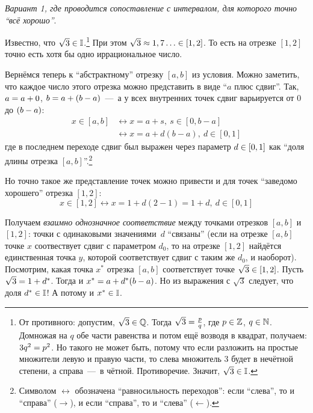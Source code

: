 \documentclass[a4paper,12pt]{article}
\begin{document}
  \begin{solution}
  
    \mbox{}\par
    \emph{Вариант 1, где проводится сопоставление с интервалом, для которого точно ``всё хорошо''}.
    
    Известно, что $\sqrt 3 \hm\in \II$.\footnote{
      От противного: допустим, $\sqrt 3 \hm\in \QQ$.
      Тогда $\sqrt 3 \hm= \frac{p}{q}$, где $p \hm\in \ZZ$, $q \hm\in \NN$.
      Домножая на $q$ обе части равенства и потом ещё возводя в квадрат, получаем: $3 q^2 \hm= p^2$.
      Но такого не может быть, потому что если разложить на простые множители левую и правую части, то слева множитель $3$ будет в нечётной степени, а справа~---~в чётной.
      Противоречие.
      Значит, $\sqrt 3 \hm\in \II$.
    }
    При этом $\sqrt 3 \hm\approx 1,7\ldots \in [1, 2]$.
    То есть на отрезке $[1, 2]$ точно есть хотя бы одно иррациональное число.
    
    Вернёмся теперь к ``абстрактному'' отрезку $[a, b]$ из условия.
    Можно заметить, что каждое число этого отрезка можно представить в виде ``$a$ плюс сдвиг''.
    Так, $a \hm= a \hm+ 0$, $b \hm= a \hm+ (b \hm- a)$~---~а у всех внутренних точек сдвиг варьируется от $0$ до $(b \hm- a)$:
    \begin{equation}
    \begin{split}
      x \in [a, b] &\leftrightarrow x = a + s,\ s \in [0, b - a]\\
                   &\leftrightarrow x = a + d (b - a),\ d \in [0, 1]
    \end{split}
    \end{equation}
    где в последнем переходе сдвиг был выражен через параметр $d \hm\in [0, 1]$ как ``доля длины отрезка $[a, b]$''.\footnote{
      Символом $\leftrightarrow$ обозначена ``равносильность переходов'': если ``слева'', то и ``справа'' ($\rightarrow$), и если ``справа'', то и ``слева'' ($\leftarrow$).
    }
    
    Но точно такое же представление точек можно привести и для точек ``заведомо хорошего'' отрезка $[1, 2]$:
    \[
      x \in [1, 2] \leftrightarrow x = 1 + d (2 - 1) = 1 + d,\ d \in [0, 1]
    \]
    
    Получаем \emph{взаимно однозначное соответствие} между точками отрезков $[a, b]$ и $[1, 2]$: точки с одинаковыми значениями~$d$ ``связаны'' (если на отрезке $[a, b]$ точке $x$ соотвествует сдвиг с параметром $d_0$, то на отрезке $[1, 2]$ найдётся единственная точка $y$, которой соответствует сдвиг с таким же $d_0$, и наоборот).
    Посмотрим, какая точка $x^*$ отрезка $[a, b]$ соответствует точке $\sqrt 3 \hm\in [1, 2]$.
    Пусть $\sqrt 3 \hm= 1 \hm+ d^*$.
    Тогда и $x^* \hm= a \hm+ d^* (b - a)$.
    Но из выражения с $\sqrt 3$ следует, что доля $d^* \hm\in \II$!
    А потому и $x^* \hm\in \II$.
    

\end{solution}
\end{document}
